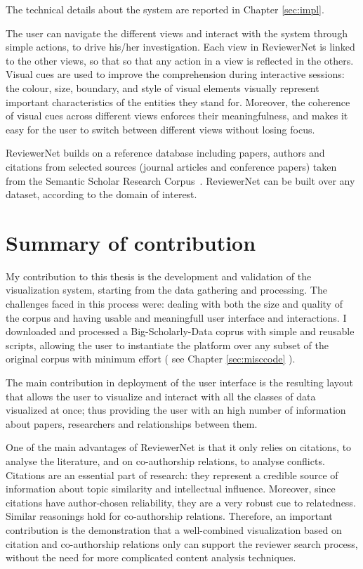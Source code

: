 The technical details about the system are reported in Chapter \ref{sec:impl}.

The user can navigate the different views and interact with the system through simple actions, to drive his/her investigation. Each view in ReviewerNet is linked to the other views, so that so that any action in a view is reflected in the others. Visual cues are used to improve the comprehension during interactive sessions: the colour, size, boundary, and style of visual elements visually represent important characteristics of the entities they stand for. Moreover, the coherence of visual cues across different views enforces their meaningfulness, and makes it easy for the user to switch between different views without losing focus.  

ReviewerNet builds on a reference database including papers, authors and citations from selected sources (journal articles and conference papers) taken from the Semantic Scholar Research Corpus~\cite{ammar:18}. ReviewerNet can be built over any dataset, according to the domain of interest.

\section{Summary of contribution}

My contribution to this thesis is the development and validation of the visualization system, starting from the data gathering and processing. The challenges faced in this process were: dealing with both the size and quality of the corpus and having usable and meaningfull user interface and interactions. I downloaded and processed a Big-Scholarly-Data coprus with simple and reusable scripts, allowing the user to instantiate the platform over any subset of the original corpus with minimum effort ( see Chapter \ref{sec:misccode} ). 

The main contribution in deployment of the user interface is the resulting layout that allows the user to visualize and interact with all the classes of data visualized at once; thus providing the user with an high number of information about papers, researchers and relationships between them.

One of the main advantages of ReviewerNet is that it only relies on citations, to analyse the literature, and on co-authorship relations, to analyse conflicts. Citations are an essential part of research: they represent a credible source of information about topic similarity and intellectual influence. Moreover, since citations have author-chosen reliability, they are a very robust cue to relatedness. Similar reasonings hold for co-authorship relations. Therefore, an important contribution is the demonstration that a well-combined visualization based on citation and co-authorship relations only can support the reviewer search process, without the need for more complicated content analysis techniques.  

